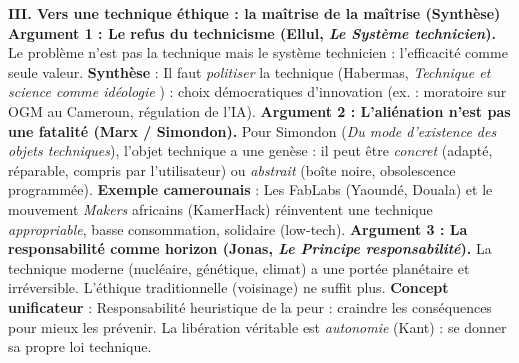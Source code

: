 \documentclass[11pt]{article}
\newcommand{\cle}[1]{{\popxbold\color{popdark}#1}}
\begin{document}
\begin{exoresolu}
    \textbf{III. Vers une \cle{technique éthique} : la maîtrise de la maîtrise (Synthèse)}
    \textbf{Argument 1 : Le refus du \cle{technicisme} (Ellul, \emph{Le Système technicien}).} Le problème n'est pas la technique mais le \cle{système technicien} : l'efficacité comme seule valeur. \textbf{Synthèse} : Il faut \emph{politiser} la technique (Habermas, \emph{Technique et science comme \guillemotleft idéologie \guillemotright}) : choix démocratiques d'innovation (ex. : moratoire sur OGM au Cameroun, régulation de l'IA).
    \textbf{Argument 2 : L'\cle{aliénation} n'est pas une fatalité (Marx / Simondon).} Pour Simondon (\emph{Du mode d'existence des objets techniques}), l'objet technique a une \cle{genèse} : il peut être \emph{concret} (adapté, réparable, compris par l'utilisateur) ou \emph{abstrait} (boîte noire, obsolescence programmée). \textbf{Exemple camerounais} : Les \cle{FabLabs} (Yaoundé, Douala) et le mouvement \emph{Makers} africains (KamerHack) réinventent une technique \emph{appropriable}, basse consommation, solidaire (\cle{low-tech}).
    \textbf{Argument 3 : La \cle{responsabilité} comme horizon (Jonas, \emph{Le Principe responsabilité}).} La technique moderne (nucléaire, génétique, climat) a une portée planétaire et irréversible. L'éthique traditionnelle (voisinage) ne suffit plus. \textbf{Concept unificateur} : \cle{Responsabilité heuristique de la peur} : craindre les conséquences pour mieux les prévenir. La libération véritable est \emph{autonomie} (Kant) : se donner sa propre loi technique.
\end{exoresolu}
\end{document}
